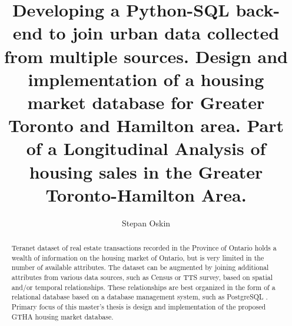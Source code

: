 \documentclass{ut-thesis}
\author{Stepan Oskin}
\title{Developing a Python-SQL back-end to join urban data collected from multiple sources.
Design and implementation of a housing market database for Greater Toronto and Hamilton area.
Part of a Longitudinal Analysis of housing sales in the Greater Toronto-Hamilton Area.}
\begin{document}
\begin{preliminary}

\maketitle


\begin{abstract}
    Teranet dataset of real estate transactions recorded in the Province of Ontario holds a wealth of information on the housing market of Ontario, but is very limited in the number of available attributes.
    The dataset can be augmented by joining additional attributes from various data sources, such as Census or TTS survey, based on spatial and/or temporal relationships.
    These relationships are best organized in the form of a relational database based on a database management system, such as PostgreSQL .
    Primary focus of this master's thesis is design and implementation of the proposed GTHA housing market database.
\end{abstract}





\end{preliminary}
\end{document}
